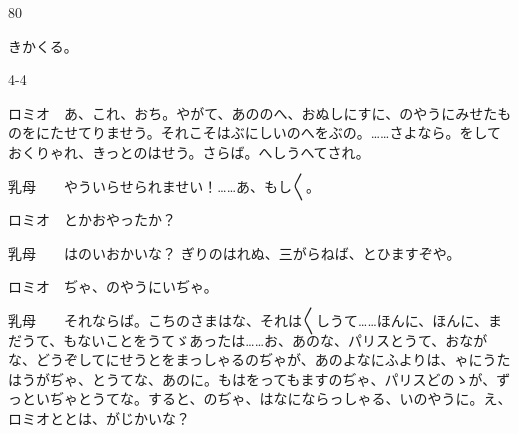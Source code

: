 \documentclass[tate,paper=b6j,jafontsize=9pt]{jlreq}
\begin{document}
\begin{azconvIndented}{8\zw}{0\zw}

きかくる。

\end{azconvIndented}
\begin{azconvIndented}{4\zw}{-4\zw}

ロミオ　あ、これ、おち。やがて、あののへ、おぬしにすに、のやうにみせたものをにたせてりませう。それこそはぶにしいのへをぶの。……さよなら。をしておくりゃれ、きっとのはせう。さらば。へしうへてされ。

乳母　　やういらせられませい！……あ、もし{〳〵}。

ロミオ　とかおやったか？

乳母　　はのいおかいな？ ぎりのはれぬ、三がらねば、とひますぞや。

ロミオ　ぢゃ、のやうにいぢゃ。

乳母　　それならば。こちのさまはな、それは{〳〵}しうて……ほんに、ほんに、まだうて、もないことをうてゞあったは……お、あのな、パリスとうて、おながな、どうぞしてにせうとをまっしゃるのぢゃが、あのよなにふよりは、ゃにうたはうがぢゃ、とうてな、あのに。もはをってもますのぢゃ、パリスどのゝが、ずっといぢゃとうてな。すると、のぢゃ、はなにならっしゃる、いのやうに。え、ロミオととは、がじかいな？


\end{azconvIndented}
\end{document}
